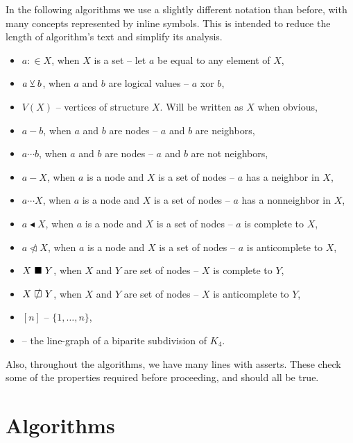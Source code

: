 In the following algorithms we use a slightly different notation than before, with many concepts represented by inline symbols. This is intended to reduce the length of algorithm's text and simplify its analysis.

\begin{itemize}
	\item $a :\in X$, when $X$ is a set -- let $a$ be equal to any element of $X$,
	\item $a \veebar b$, when $a$ and $b$ are logical values -- $a$ xor $b$,
	\item $V(X)$ -- vertices of structure $X$. Will be written as $X$ when obvious,
	\item $a - b$, when $a$ and $b$ are nodes -- $a$ and $b$ are neighbors,
	\item $a \cdots b$, when $a$ and $b$ are nodes -- $a$ and $b$ are not neighbors,
	\item $a - X$, when $a$ is a node and $X$ is a set of nodes -- $a$ has a neighbor in $X$,
	\item $a \cdots X$, when $a$ is a node and $X$ is a set of nodes -- $a$ has a nonneighbor in $X$,
	\item $a \blacktriangleleft  X$, when $a$ is a node and $X$ is a set of nodes -- $a$ is complete to $X$,
	\item $a \ntriangleleft X$, when $a$ is a node and $X$ is a set of nodes -- $a$ is anticomplete to $X$,
	\item $X \ \blacksquare\  Y$, when $X$ and $Y$ are set of nodes -- $X$ is complete to $Y$,
	\item $X \setAntiComplete Y$, when $X$ and $Y$ are set of nodes -- $X$ is anticomplete to $Y$,
	\item $[n]$  -- $\{1, \ldots, n\}$,
	\item \LGBSK -- the line-graph of a biparite subdivision of $K_4$.
\end{itemize}

Also, throughout the algorithms, we have many lines with asserts. These check some of the properties required before proceeding, and should all be true.

\clearpage
\section{Algorithms}


\clearpage

\noindent
\clearpage

